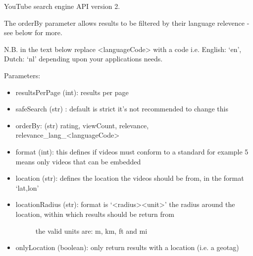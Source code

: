 \documentclass[letterpaper,10pt,english]{sphinxmanual}
\begin{document}
\begin{fulllineitems}
\label{api3.0:puppy.search.engine.YouTubeV2}
YouTube search engine API version 2.

The orderBy parameter allows results to be filtered by their language relevence - see below for more.

N.B. in the text below replace \textless{}languageCode\textgreater{} with a code i.e. English: `en', Dutch: `nl' depending upon your applications needs.

Parameters:
\begin{itemize}
\item {} 
resultsPerPage (int): results per page

\item {} 
safeSearch (str) : default is strict it's not recommended to change this

\item {} 
orderBy: (str)  rating, viewCount, relevance, relevance\_lang\_\textless{}languageCode\textgreater{}

\item {} 
format (int): this defines if videos must conform to a standard for example 5 means only videos that can be embedded

\item {} 
location (str): defines the location the videos should be from, in the format `lat,lon'

\item {} \begin{description}
\item[{locationRadius (str): format is `\textless{}radius\textgreater{}\textless{}unit\textgreater{}' the radius around the location, within which results should be return from}] \leavevmode
the valid units are: m, km, ft and mi

\end{description}

\item {} 
onlyLocation (boolean): only return results with a location (i.e. a geotag)

\end{itemize}

\end{fulllineitems}
\end{document}
